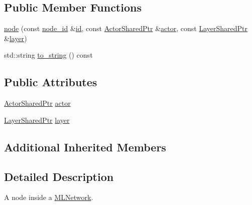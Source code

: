 \subsection*{Public Member Functions}
\begin{DoxyCompactItemize}
\item 
\hyperlink{classmlnet_1_1node_ac15d064db76b462b368ff88bf298a63f}{node} (const \hyperlink{namespacemlnet_a4c354f08ca868982bf3ddae882ff71c6}{node\+\_\+id} \&\hyperlink{classmlnet_1_1basic__component_a7d56ea959ef686405bc0fa4830b03347}{id}, const \hyperlink{namespacemlnet_a714fd98ffaeaadd5c38d61fa53dc4d24}{Actor\+Shared\+Ptr} \&\hyperlink{classmlnet_1_1actor}{actor}, const \hyperlink{namespacemlnet_a10c007fb811c55339dd5b9d32bb0505d}{Layer\+Shared\+Ptr} \&\hyperlink{classmlnet_1_1layer}{layer})
\item 
std\+::string \hyperlink{classmlnet_1_1node_ad5685fbd552276eb4adb1eae9b5851d3}{to\+\_\+string} () const 
\end{DoxyCompactItemize}
\subsection*{Public Attributes}
\begin{DoxyCompactItemize}
\item 
\hyperlink{namespacemlnet_a714fd98ffaeaadd5c38d61fa53dc4d24}{Actor\+Shared\+Ptr} \hyperlink{classmlnet_1_1node_a3d003cd3e2fc96297a4e3fe5a7c8d0b1}{actor}
\item 
\hyperlink{namespacemlnet_a10c007fb811c55339dd5b9d32bb0505d}{Layer\+Shared\+Ptr} \hyperlink{classmlnet_1_1node_ab7c3c0f9c8c0bd4952f764aa9215217e}{layer}
\end{DoxyCompactItemize}
\subsection*{Additional Inherited Members}


\subsection{Detailed Description}
A node inside a \hyperlink{classmlnet_1_1_m_l_network}{M\+L\+Network}. 

